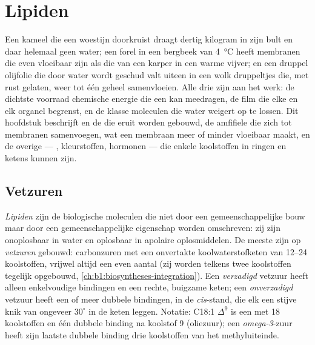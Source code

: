 \chapter{Lipiden}\label{ch:b1:lipids}

Een kameel die een woestijn doorkruist draagt dertig kilogram  in zijn bult en
daar helemaal geen water; een forel in een bergbeek van \qty{4}{\celsius} heeft
membranen die even vloeibaar zijn als die van een karper in een warme vijver; en
een druppel olijfolie die door water wordt geschud valt uiteen in een wolk
druppeltjes die, met rust gelaten, weer tot één geheel samenvloeien. Alle drie
zijn  aan het werk: de dichtste voorraad chemische energie die een
 kan meedragen, de film die elke  en elk organel begrenst, en de
klasse moleculen die water weigert op te lossen. Dit hoofdstuk beschrijft
 en de  die eruit worden gebouwd, de amfifiele  die zich tot
membranen samenvoegen, wat een membraan meer of minder vloeibaar maakt, en de
overige  --- , kleurstoffen, hormonen --- die enkele koolstoffen
in ringen en ketens kunnen zijn.

\section{Vetzuren}

\begin{definition}\label{def:b1:lipids:fattyacid}
\emph{Lipiden} zijn de biologische moleculen die niet door een
gemeenschappelijke bouw maar door een gemeenschappelijke eigenschap worden
omschreven: zij zijn onoplosbaar in water en oplosbaar in apolaire
oplosmiddelen. De meeste zijn op \emph{vetzuren} gebouwd:
carbonzuren met een onvertakte koolwaterstofketen van \qtyrange{12}{24}{}
koolstoffen, vrijwel altijd een even aantal (zij worden telkens twee koolstoffen
tegelijk opgebouwd, \cref{ch:b1:biosyntheses-integration}). Een
\emph{verzadigd} vetzuur heeft alleen enkelvoudige
bindingen en een rechte, buigzame keten; een \emph{onverzadigd} vetzuur heeft een of meer dubbele bindingen, in de \emph{cis}-stand, die
elk een stijve knik van ongeveer $30^\circ$ in de keten leggen. Notatie: C18:1
$\Delta^9$ is een  met 18 koolstoffen en één dubbele binding na koolstof 9
(oliezuur); een \emph{omega-3}-zuur heeft zijn laatste dubbele binding drie
koolstoffen van het methyluiteinde.
\end{definition}

